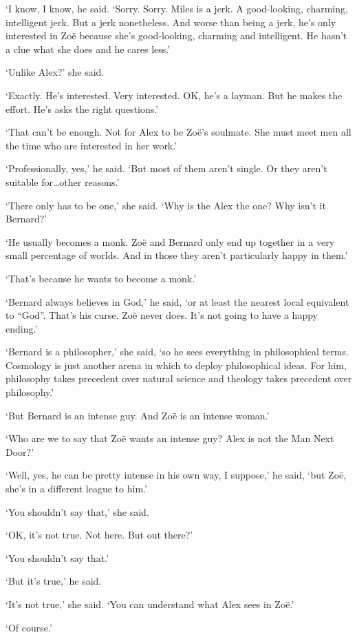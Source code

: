 `I know, I know, he said. `Sorry. Sorry. Miles is a jerk. A good-looking, charming, intelligent jerk. But a
jerk nonetheless. And worse than being a jerk, he's only interested
in Zoë because she's good-looking, charming and intelligent. He
hasn't a clue what she does and he cares less.'

`Unlike Alex?' she said.

`Exactly. He's interested. Very interested. OK, he's a layman. But
he makes the effort. He's asks the right questions.'

`That can't be enough. Not for Alex to be Zoë's
soulmate. She must meet men all the time who are interested in her
work.'

`Professionally, yes,' he said. `But most of them aren't single. Or they aren't
suitable for\dots other reasons.'

`There only has to be one,' she said. `Why is the Alex the one?
Why isn't it Bernard?'

`He usually becomes a monk. Zoë and Bernard only end up together
in a very small percentage of worlds. And in those they aren't particularly
happy in them.'

`That's because he wants to become a monk.'

`Bernard always believes in God,' he said, `or at least the nearest local equivalent to ``God''. That's his curse. Zoë
never does. It's not going to have a happy ending.'

`Bernard is a philosopher,' she said, `so he sees everything in
philosophical terms. Cosmology is just another arena in which to
deploy philosophical ideas. For him, philosophy takes precedent
over natural science and theology takes precedent over philosophy.'

`But Bernard is an intense guy. And Zoë is an intense woman.'

`Who are we to say that Zoë wants an intense guy? Alex is not
the Man Next Door?'

`Well, yes, he can be pretty intense in his own way, I suppose,' he said, `but
Zoë, she's in a different league to him.'

`You shouldn't say that,' she said.

`OK, it's not true. Not here. But out there?'

`You shouldn't say that.'

`But it's true,' he said.

`It's not true,' she said. `You can understand what Alex sees in Zoë.'

`Of course.'

